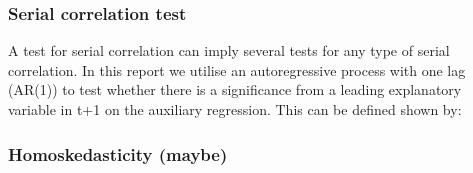 
\subsubsection*{Serial correlation test}
A test for serial correlation can imply several tests for any type of serial correlation. In this report we utilise an autoregressive process with one lag (AR(1)) to test whether there is a significance from a leading explanatory variable in t+1 on the auxiliary regression. This can be defined shown by:

\subsubsection*{Homoskedasticity (maybe)}

